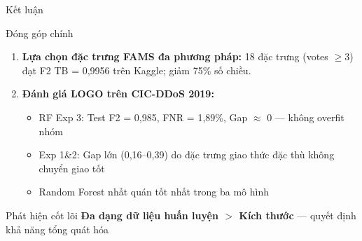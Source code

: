 \documentclass[aspectratio=169,12pt]{beamer}
\begin{document}
\begin{frame}{Kết luận}
  \begin{block}{Đóng góp chính}
    \begin{enumerate}
      \item \textbf{Lựa chọn đặc trưng FAMS đa phương pháp:} 18 đặc trưng (votes $\geq 3$) đạt F2 TB = 0,9956 trên Kaggle; giảm 75\% số chiều.

      \vspace{0.4em}
      \item \textbf{Đánh giá LOGO trên CIC-DDoS 2019:}
        \begin{itemize}
          \item RF Exp 3: Test F2 = 0,985, FNR = 1,89\%, Gap $\approx$ 0 --- không overfit nhóm
          \item Exp 1\&2: Gap lớn (0,16--0,39) do đặc trưng giao thức đặc thù không chuyển giao tốt
          \item Random Forest nhất quán tốt nhất trong ba mô hình
        \end{itemize}
    \end{enumerate}
  \end{block}
  \vspace{0.3em}
  \begin{alertblock}{Phát hiện cốt lõi}
    \textbf{Đa dạng dữ liệu huấn luyện $>$ Kích thước} --- quyết định khả năng tổng quát hóa
  \end{alertblock}
\end{frame}
\end{document}
